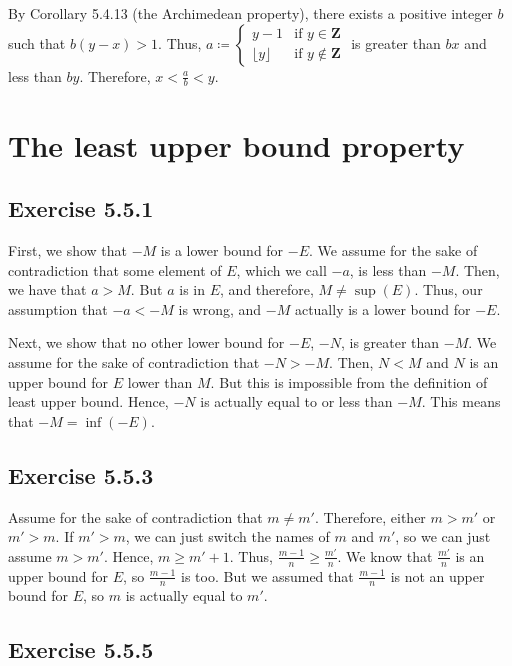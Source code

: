 \documentclass[12pt, oneside]{book}
\begin{document}
	By Corollary 5.4.13 (the Archimedean property), there exists a positive integer $b$ such that $b(y - x) > 1$. Thus, $a \coloneqq
	\begin{cases}
		y - 1 & \text{if } y \in \mathbf{Z} \\
		\lfloor y \rfloor & \text{if } y \not \in \mathbf{Z}
	\end{cases}$
	is greater than $bx$ and less than $by$. Therefore, $x < \frac{a}{b} < y$.

	\section{The least upper bound property}

	\subsection*{Exercise 5.5.1}

	First, we show that $-M$ is a lower bound for $-E$. We assume for the sake of contradiction that some element of $E$, which we call $-a$, is less than $-M$. Then, we have that $a > M$. But $a$ is in $E$, and therefore, $M \ne \sup(E)$. Thus, our assumption that $-a < -M$ is wrong, and $-M$ actually is a lower bound for $-E$.

	Next, we show that no other lower bound for $-E$, $-N$, is greater than $-M$. We assume for the sake of contradiction that $-N > -M$. Then, $N < M$ and $N$ is an upper bound for $E$ lower than $M$. But this is impossible from the definition of least upper bound. Hence, $-N$ is actually equal to or less than $-M$. This means that $-M = \inf(-E)$.

	\subsection*{Exercise 5.5.3}

	Assume for the sake of contradiction that $m \ne m'$. Therefore, either $m > m'$ or $m' > m$. If $m' > m$, we can just switch the names of $m$ and $m'$, so we can just assume $m > m'$. Hence, $m \ge m' + 1$. Thus, $\frac{m - 1}{n} \ge \frac{m'}{n}$. We know that $\frac{m'}{n}$ is an upper bound for $E$, so $\frac{m - 1}{n}$ is too. But we assumed that $\frac{m - 1}{n}$ is not an upper bound for $E$, so $m$ is actually equal to $m'$.

	\subsection*{Exercise 5.5.5}
\end{document}
